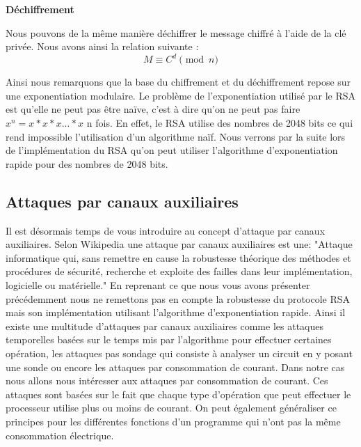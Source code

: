\textbf{Déchiffrement}


Nous pouvons de la même manière déchiffrer le message chiffré à l'aide de la clé privée. 
Nous avons ainsi la relation suivante :
\begin{equation}
\label{eq:dechiffrement}
M \equiv C^d \pmod{n}
\end{equation}


Ainsi nous remarquons que la base du chiffrement et du déchiffrement repose sur une exponentiation modulaire. Le problème de l'exponentiation utilisé par le RSA est qu'elle ne peut pas être naïve, c'est à dire qu'on ne peut pas faire $ x^n = x*x*x...*x$ n fois. En effet, le RSA utilise des nombres de 2048 bits ce qui rend impossible l'utilisation d'un algorithme naïf.
Nous verrons par la suite lors de l'implémentation du RSA qu'on peut utiliser l'algorithme d'exponentiation rapide pour des nombres de 2048 bits.
\newpage
\subsection{Attaques par canaux auxiliaires}
Il est désormais temps de vous introduire au concept d'attaque par canaux auxiliaires.
Selon Wikipedia une attaque par canaux auxiliaires est une:
"Attaque informatique qui, sans remettre en cause la robustesse théorique des méthodes et procédures de sécurité, recherche et exploite des failles dans leur implémentation, logicielle ou matérielle."
En reprenant ce que nous vous avons présenter précédemment nous ne remettons pas en compte la robustesse du protocole RSA mais son implémentation utilisant l'algorithme d’exponentiation rapide.
Ainsi il existe une multitude d'attaques par canaux auxiliaires comme les attaques temporelles basées sur le temps mis par l'algorithme pour effectuer certaines opération, les attaques pas sondage qui consiste à analyser un circuit en y posant une sonde ou encore les attaques par consommation de courant.
Dans notre cas nous allons nous intéresser aux attaques par consommation de courant. Ces attaques sont basées sur le fait que chaque type d'opération que peut effectuer le processeur utilise plus ou moins de courant. On peut également généraliser ce principes pour les différentes fonctions d'un programme qui n'ont pas la même consommation électrique.
\newpage

